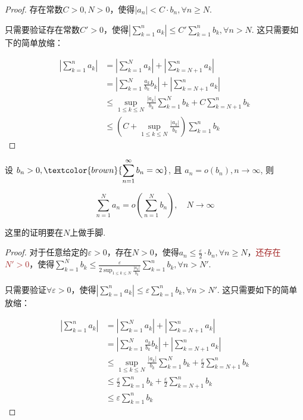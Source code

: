 \begin{proof}
    存在常数$C>0,N>0$，使得$\left|a_n\right|<C\cdot b_n,\forall n\ge N$.

    只需要验证存在常数$C'>0$，使得$\displaystyle \left|\sum_{k=1}^{n}a_k\right|\le C'\sum_{k=1}^{n}b_k,\forall n>N.$ 这只需要如下的简单放缩：

    \begin{align*}
        \left|\sum_{k=1}^{n}a_k\right| &=\left|\sum_{k=1}^{N}a_k\right|+\left|\sum_{k=N+1}^{n}a_k\right| \\
        &=\left|\sum_{k=1}^{N}\frac{a_k}{b_k}b_k\right|+\left|\sum_{k=N+1}^{n}a_k\right| \\
        &\le \sup_{1\le k\le N}\frac{\left|a_k\right|}{b_k}\sum_{k=1}^{N}b_k+C \sum_{k=N+1}^{n}b_k \\
        &\le \left(C+\sup_{1\le k\le N}\frac{\left|a_k\right|}{b_k}\right)\sum_{k=1}^{n}b_k
    \end{align*}
\end{proof}

\begin{proposition}
    设 $b_n>0, \textcolor{brown}{\displaystyle\sum_{n=1}^{\infty} b_n=\infty}$, 且 $a_n=o\left(b_n\right), n \rightarrow \infty$, 则

    $$
        \sum_{n=1}^N a_n=o\left(\sum_{n=1}^N b_n\right), \quad N \rightarrow \infty
    $$

\end{proposition}

\begin{note}
    这里的证明要在$N$上做手脚.
\end{note}

\begin{proof}
    对于任意给定的$\varepsilon>0$，存在$N>0$，使得$a_n\le \displaystyle\frac{\varepsilon}{2} \cdot b_n,\forall n\ge N$，\textcolor{brown}{还存在$N'>0$}，使得$\displaystyle\sum_{k=1}^{N}b_k\le \displaystyle\frac{\varepsilon}{2 \displaystyle \sup_{1\le k\le N}\frac{\left|a_k\right|}{b_k}} \displaystyle\sum_{k=1}^{n}b_k,\forall n>N'$.

    只需要验证$\forall \varepsilon>0$，使得$\displaystyle \left|\sum_{k=1}^{n}a_k\right|\le \varepsilon\sum_{k=1}^{n}b_k,\forall n>N'.$ 这只需要如下的简单放缩：

    \begin{align*}
        \left|\sum_{k=1}^{n}a_k\right| &=\left|\sum_{k=1}^{N}a_k\right|+\left|\sum_{k=N+1}^{n}a_k\right| \\
        &=\left|\sum_{k=1}^{N}\frac{a_k}{b_k}b_k\right|+\left|\sum_{k=N+1}^{n}a_k\right| \\
        &\le \sup_{1\le k\le N}\frac{\left|a_k\right|}{b_k}\sum_{k=1}^{N}b_k+\displaystyle\frac{\varepsilon}{2} \sum_{k=N+1}^{n}b_k \\
        &\le \displaystyle\frac{\varepsilon}{2} \displaystyle\sum_{k=1}^{n}b_k+\frac{\varepsilon}{2} \sum_{k=N+1}^{n}b_k \\
        &\le \varepsilon \displaystyle\sum_{k=1}^{n}b_k
    \end{align*}
\end{proof}

